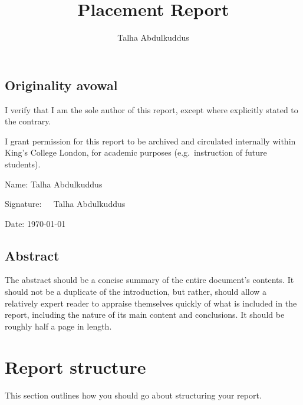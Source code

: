 \documentclass[british,12pt,a4paper]{report}
\begin{document}
\title{Placement Report}
\author{Talha Abdulkuddus}


\setcounter{page}{2} %

\vfill{}

\section*{Originality avowal}

I verify that I am the sole author of this report, except where explicitly
stated to the contrary.

I grant permission for this report to be archived and circulated
internally within King's College London, for academic purposes
(e.g.\ instruction of future students).

\bigskip{}

Name: Talha Abdulkuddus

\medskip{}

Signature:
{\(
    \begin{array}{l}
        
    \end{array}
    \)}
{Talha Abdulkuddus}

\medskip{}

Date: \today{}

\vfill{}

\section*{Abstract}

The abstract should be a concise summary of the entire document's contents.
It should not be a duplicate of the introduction, but rather,
should allow a relatively expert reader to appraise themselves quickly
of what is included in the report,
including the nature of its main content and conclusions.
It should be roughly half a page in length.

\vfill{}

\tableofcontents{}
\listoffigures{}



\chapter{Report structure}

This section outlines how you should go about structuring your report.
\end{document}
